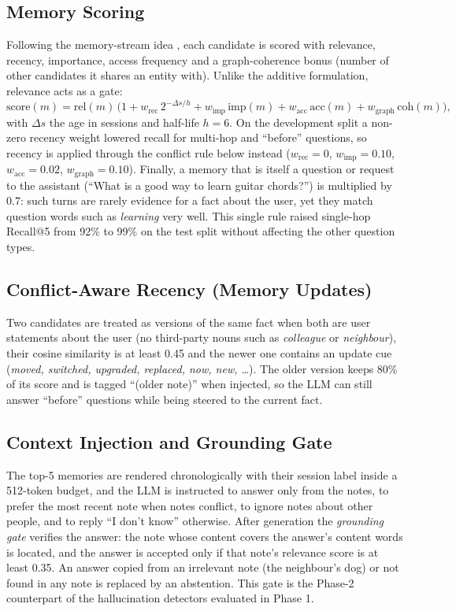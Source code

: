 \subsection{Memory Scoring}
\label{sec:scoring}
Following the memory-stream idea \cite{park2023}, each candidate is scored with relevance, recency,
importance, access frequency and a graph-coherence bonus (number of other candidates it shares an entity
with). Unlike the additive formulation, relevance acts as a gate:
\[
  \text{score}(m) = \text{rel}(m)\,\bigl(1 + w_{\text{rec}}\,2^{-\Delta s/h} + w_{\text{imp}}\,\text{imp}(m)
  + w_{\text{acc}}\,\text{acc}(m) + w_{\text{graph}}\,\text{coh}(m)\bigr),
\]
with $\Delta s$ the age in sessions and half-life $h = 6$. On the development split a non-zero recency
weight lowered recall for multi-hop and ``before'' questions, so recency is applied through the conflict
rule below instead ($w_{\text{rec}} = 0$, $w_{\text{imp}} = 0.10$, $w_{\text{acc}} = 0.02$,
$w_{\text{graph}} = 0.10$). Finally, a memory that is itself a question or request to the assistant
(``What is a good way to learn guitar chords?'') is multiplied by $0.7$: such turns are rarely evidence for
a fact about the user, yet they match question words such as \emph{learning} very well. This single rule
raised single-hop Recall@5 from 92\% to 99\% on the test split without affecting the other question types.

\subsection{Conflict-Aware Recency (Memory Updates)}
Two candidates are treated as versions of the same fact when both are user statements about the user (no
third-party nouns such as \emph{colleague} or \emph{neighbour}), their cosine similarity is at least 0.45 and
the newer one contains an update cue (\emph{moved, switched, upgraded, replaced, now, new, \dots}). The older
version keeps 80\% of its score and is tagged ``(older note)'' when injected, so the LLM can still answer
``before'' questions while being steered to the current fact.

\subsection{Context Injection and Grounding Gate}
The top-5 memories are rendered chronologically with their session label inside a 512-token budget, and the
LLM is instructed to answer only from the notes, to prefer the most recent note when notes conflict, to
ignore notes about other people, and to reply ``I don't know'' otherwise. After generation the
\emph{grounding gate} verifies the answer: the note whose content covers the answer's content words is
located, and the answer is accepted only if that note's relevance score is at least 0.35. An answer copied
from an irrelevant note (the neighbour's dog) or not found in any note is replaced by an abstention. This
gate is the Phase-2 counterpart of the hallucination detectors evaluated in Phase 1.

